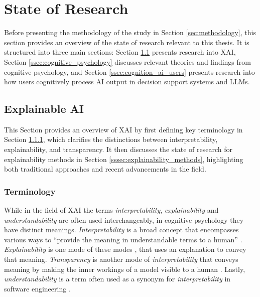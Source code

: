 \section{State of Research} \label{sec:state_of_research}

Before presenting the methodology of the study in Section \ref{sec:methodology}, this section provides an overview of the state of research relevant to this thesis. It is structured into three main sections: Section \ref{ssec:xai} presents research into \ac{XAI}, Section \ref{ssec:cognitive_psychology} discusses relevant theories and findings from cognitive psychology, and Section \ref{ssec:cognition_ai_users} presents research into how users cognitively process \ac{AI} output in decision support systems and \acp{LLM}.

\subsection{Explainable AI} \label{ssec:xai}

This Section provides an overview of \ac{XAI} by first defining key terminology in Section \ref{sssec:terminology}, which clarifies the distinctions between interpretability, explainability, and transparency. It then discusses the state of research for explainability methods in Section \ref{sssec:explainability_methods}, highlighting both traditional approaches and recent advancements in the field.

\subsubsection{Terminology} \label{sssec:terminology}

While in the field of \ac{XAI} the terms \textit{interpretability}, \textit{explainability} and \textit{understandability} are often used interchangeably, in cognitive psychology they have distinct meanings. \textit{Interpretability} is a broad concept that encompasses various ways to “provide the meaning in understandable terms to a human” \parencite{Arieta2020}. \textit{Explainability} is one mode of these modes \parencite{Lipton2016}, that uses an explanation to convey that meaning. \textit{Transparency} is another mode of \textit{interpretability} that conveys meaning by making the inner workings of a model visible to a human \parencite{Arieta2020}. Lastly, \textit{understandability} is a term often used as a synonym for \textit{interpretability} in software engineering \parencite{Alonso2018}.

